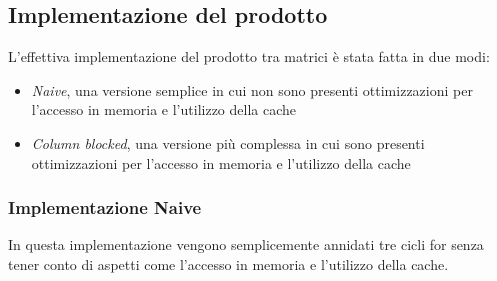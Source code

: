 \documentclass[conference]{IEEEtran}
\begin{document}
\subsection{Implementazione del prodotto}
L'effettiva implementazione del prodotto tra matrici è stata fatta in due modi:
\begin{itemize}
    \item \textit{Naive}, una versione semplice in cui non sono presenti ottimizzazioni per l'accesso in memoria e l'utilizzo della cache
    \item \textit{Column blocked}, una versione più complessa in cui sono presenti ottimizzazioni per l'accesso in memoria e l'utilizzo della cache
\end{itemize}
\subsubsection{Implementazione Naive}
In questa implementazione vengono semplicemente annidati tre cicli for senza tener conto di aspetti come l'accesso in memoria e l'utilizzo della cache.
\end{document}

